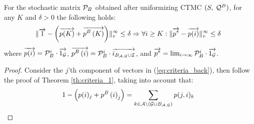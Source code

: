 \documentclass{entcs}
\begin{document}
		\begin{theorem}
			For the stochastic matrix $\mathcal{P}_{B}$ obtained after uniformizing CTMC $(S,\:\mathcal{Q}^{B})$, for any $K$ and $\delta > 0$ the following holds:
				\begin{equation}
					\nvecinf{ \overrightarrow{1} - \left( \vpK + \vbpK \right) } \leq \delta \Rightarrow \forall i \geq K : \nvecinf{\vpp - \vpi} \leq \delta
					\label{eq:criteria_back}
				\end{equation}
			where $\overrightarrow{p(i)} = \mathcal{P}_{B}^{i} \cdot \overrightarrow{1_{\mathcal{G}}}$, $\overrightarrow{p^{B}\left( i \right)} = \mathcal{P}_{B}^{i} \cdot \overrightarrow {i_{B_{ \mathcal{A}, \mathcal{G} } \cup \mathcal{I}}}$, and $\overrightarrow{p^{*}} = \lim_{i \rightarrow \infty} \mathcal{P}_{B}^{i} \cdot \overrightarrow{1_{\mathcal{G}}}$.
		\end{theorem}
		{\small
			\begin{proof}
				Consider the $j$'th component of vectors in (\ref{eq:criteria_back}), then follow the proof of Theorem \ref{th:criteria_1}, taking into account that:
				\begin{equation}
					1 - \left( p(i)_{j} + p^{B}\left( i \right)_{j} \right) = \sum_{k \in \mathcal{A} \setminus \left( \mathcal{G} \cup B_{ \mathcal{A}, \mathcal{G} } \right)} p(j,i)_{k} \nonumber
				\end{equation}
			\end{proof}
		}
\end{document}
